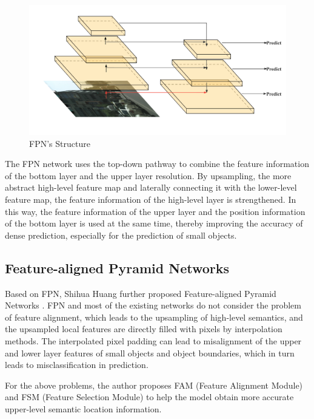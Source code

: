 \begin{figure}[htbp]
    \centering
    \includegraphics[width=1\textwidth]{figures/FPN_h.png}
    \caption{FPN's Structure \cite{plotNeuralNet}}\label{FPN}
\end{figure}

The FPN network uses the top-down pathway to combine the feature information of the bottom layer and the upper layer resolution. By upsampling, the more abstract high-level feature map and laterally connecting it with the lower-level feature map, the feature information of the high-level layer is strengthened. In this way, the feature information of the upper layer and the position information of the bottom layer is used at the same time, thereby improving the accuracy of dense prediction, especially for the prediction of small objects.


\subsection{Feature-aligned Pyramid Networks}

Based on FPN, Shihua Huang further proposed Feature-aligned Pyramid Networks \cite{huang2021fapn}. FPN and most of the existing networks do not consider the problem of feature alignment, which leads to the upsampling of high-level semantics, and the upsampled local features are directly filled with pixels by interpolation methods. The interpolated pixel padding can lead to misalignment of the upper and lower layer features of small objects and object boundaries, which in turn leads to misclassification in prediction.

For the above problems, the author proposes FAM (Feature Alignment Module) and FSM (Feature Selection Module) to help the model obtain more accurate upper-level semantic location information.


